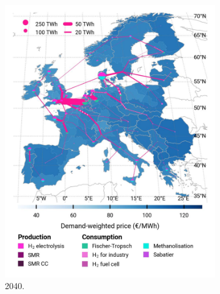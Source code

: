\documentclass[preprint,12pt,sort&compress]{elsarticle}
\begin{document}
\begin{figure}[htbp]
\begin{subfigure}[t]{0.33\textwidth}
      \includegraphics[width=1\textwidth]{maps/greenfield-pipelines/base_s_adm___2040-balance_map_H2}
      \caption{ 2040.}
      \label{fig:CP_lt_2040_h2}
  \end{subfigure}
  \begin{subfigure}[t]{0.33\textwidth}
    \vspace{0pt}

\end{subfigure}
\end{figure}
\end{document}
